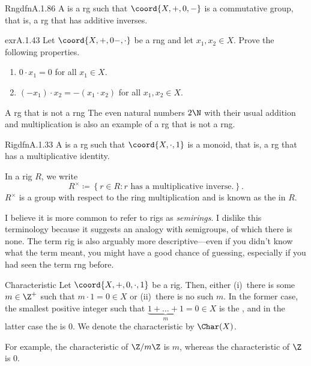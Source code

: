 \begin{dfn}{Rng}{dfnA.1.86}
A  is a rg such that $\coord{X,+,0,-}$ is a commutative group, that is, a rg that has additive inverses.
\end{dfn}
\begin{exr}{}{exrA.1.43}
Let $\coord{X,+,0-,\cdot}$ be a rng and let $x_1,x_2\in X$.  Prove the following properties.
\begin{enumerate}
\item $0\cdot x_1=0$ for all $x_1\in X$.
\item $(-x_1)\cdot x_2=-(x_1\cdot x_2)$ for all $x_1,x_2\in X$.
\end{enumerate}
\end{exr}
\begin{exm}{A rg that is not a rng}{}
The even natural numbers $2\N$ with their usual addition and multiplication is also an example of a rg that is not a rng.
\end{exm}
\begin{dfn}{Rig}{dfnA.1.33}
A  is a rg such that $\coord{X,\cdot ,1}$ is a monoid, that is, a rg that has a multiplicative identity.
\begin{rmk}
In a rig $R$, we write
\begin{equation}\label{eqnA.1.34}
    R^{\times}\coloneqq \left\{ r\in R:r\text{ has a multiplicative inverse.}\right\} .
\end{equation}
$R^{\times}$ is a group with respect to the ring multiplication and is known as the  in $R$.
\end{rmk}
\begin{rmk}
I believe it is more common to refer to rigs as \emph{semirings}.  I dislike this terminology because it suggests an analogy with semigroups, of which there is none.  The term rig is also arguably more descriptive---even if you didn't know what the term meant, you might have a good chance of guessing, especially if you had seen the term rng before.
\end{rmk}
\end{dfn}
\begin{dfn}{Characteristic}{}
Let $\coord{X,+,0,\cdot ,1}$ be a rig.  Then, either (i)~there is some $m\in \Z ^+$ such that $m\cdot 1=0\in X$ or (ii)~there is no such $m$.  In the former case, the smallest positive integer such that $\underbrace{1+\dots +1}_m=0\in X$ is the , and in the latter case the  is $0$.  We denote the characteristic by $\Char (X)$.
\begin{rmk}
For example, the characteristic of $\Z /m\Z$ is $m$, whereas the characteristic of $\Z$ is $0$.
\end{rmk}
\end{dfn}
